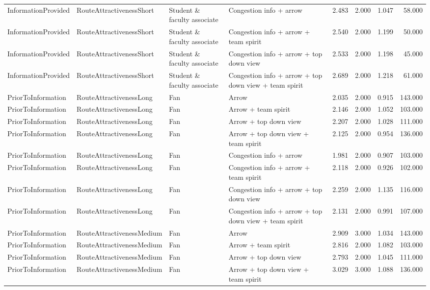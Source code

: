 \begin{tabular}{llllrrrr}
  InformationProvided & RouteAttractivenessShort & Student \& faculty associate & Congestion info + arrow & 2.483 & 2.000 & 1.047 & 58.000 \\ 
  InformationProvided & RouteAttractivenessShort & Student \& faculty associate & Congestion info + arrow + team spirit & 2.540 & 2.000 & 1.199 & 50.000 \\ 
  InformationProvided & RouteAttractivenessShort & Student \& faculty associate & Congestion info + arrow + top down view & 2.533 & 2.000 & 1.198 & 45.000 \\ 
  InformationProvided & RouteAttractivenessShort & Student \& faculty associate & Congestion info + arrow + top down view + team spirit & 2.689 & 2.000 & 1.218 & 61.000 \\ 
  PriorToInformation & RouteAttractivenessLong & Fan & Arrow & 2.035 & 2.000 & 0.915 & 143.000 \\ 
  PriorToInformation & RouteAttractivenessLong & Fan & Arrow + team spirit & 2.146 & 2.000 & 1.052 & 103.000 \\ 
  PriorToInformation & RouteAttractivenessLong & Fan & Arrow + top down view & 2.207 & 2.000 & 1.028 & 111.000 \\ 
  PriorToInformation & RouteAttractivenessLong & Fan & Arrow + top down view + team spirit & 2.125 & 2.000 & 0.954 & 136.000 \\ 
  PriorToInformation & RouteAttractivenessLong & Fan & Congestion info + arrow & 1.981 & 2.000 & 0.907 & 103.000 \\ 
  PriorToInformation & RouteAttractivenessLong & Fan & Congestion info + arrow + team spirit & 2.118 & 2.000 & 0.926 & 102.000 \\ 
  PriorToInformation & RouteAttractivenessLong & Fan & Congestion info + arrow + top down view & 2.259 & 2.000 & 1.135 & 116.000 \\ 
  PriorToInformation & RouteAttractivenessLong & Fan & Congestion info + arrow + top down view + team spirit & 2.131 & 2.000 & 0.991 & 107.000 \\ 
  PriorToInformation & RouteAttractivenessMedium & Fan & Arrow & 2.909 & 3.000 & 1.034 & 143.000 \\ 
  PriorToInformation & RouteAttractivenessMedium & Fan & Arrow + team spirit & 2.816 & 2.000 & 1.082 & 103.000 \\ 
  PriorToInformation & RouteAttractivenessMedium & Fan & Arrow + top down view & 2.793 & 2.000 & 1.045 & 111.000 \\ 
  PriorToInformation & RouteAttractivenessMedium & Fan & Arrow + top down view + team spirit & 3.029 & 3.000 & 1.088 & 136.000 \\ 

\end{tabular}
